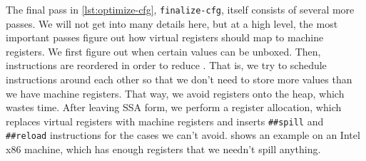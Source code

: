 
The final pass in \vref{lst:optimize-cfg}, \Verb|finalize-cfg|, itself
consists of several more passes.  We will not get into many details here, but
at a high level, the most important passes figure out how virtual registers
should map to machine registers.  We first figure out when certain values can
be unboxed.  Then, instructions are reordered in order to reduce .  That is, we try to schedule instructions around each other so that
we don't need to store more values than we have machine registers.  That way,
we avoid  registers onto the heap, which wastes time.  After
leaving \gls{SSA} form, we perform a  register allocation,
which replaces virtual registers with machine registers and inserts
\Verb|##spill| and \Verb|##reload| instructions for the cases we can't
avoid.   shows an example on an Intel x86 machine, which
has enough registers that we needn't spill anything.
